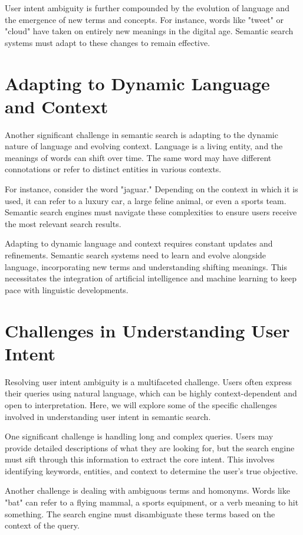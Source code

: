 \documentclass[10pt,oneside,a4paper]{article}
\begin{document}
User intent ambiguity is further compounded by the evolution of language and the emergence of new terms and concepts. For instance, words like "tweet" or "cloud" have taken on entirely new meanings in the digital age. Semantic search systems must adapt to these changes to remain effective.

\section{Adapting to Dynamic Language and Context}
Another significant challenge in semantic search is adapting to the dynamic nature of language and evolving context. Language is a living entity, and the meanings of words can shift over time. The same word may have different connotations or refer to distinct entities in various contexts.

For instance, consider the word "jaguar." Depending on the context in which it is used, it can refer to a luxury car, a large feline animal, or even a sports team. Semantic search engines must navigate these complexities to ensure users receive the most relevant search results.

Adapting to dynamic language and context requires constant updates and refinements. Semantic search systems need to learn and evolve alongside language, incorporating new terms and understanding shifting meanings. This necessitates the integration of artificial intelligence and machine learning to keep pace with linguistic developments.

\section{Challenges in Understanding User Intent}
Resolving user intent ambiguity is a multifaceted challenge. Users often express their queries using natural language, which can be highly context-dependent and open to interpretation. Here, we will explore some of the specific challenges involved in understanding user intent in semantic search.

One significant challenge is handling long and complex queries. Users may provide detailed descriptions of what they are looking for, but the search engine must sift through this information to extract the core intent. This involves identifying keywords, entities, and context to determine the user's true objective.

Another challenge is dealing with ambiguous terms and homonyms. Words like "bat" can refer to a flying mammal, a sports equipment, or a verb meaning to hit something. The search engine must disambiguate these terms based on the context of the query.
\end{document}
